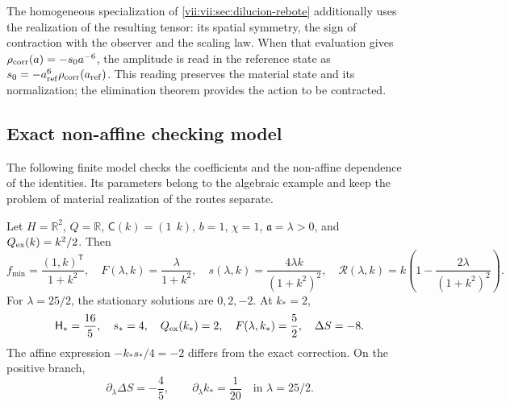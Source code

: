 The homogeneous specialization of
\ref{vii:vii:sec:dilucion-rebote} additionally uses the realization of the
resulting tensor: its spatial symmetry, the sign of contraction
with the observer and the scaling law. When that evaluation gives
\(\rho_{\rm corr}(a)=-s_0a^{-6}\), the amplitude is read in the
reference state as
\(s_0=-a_{\rm ref}^{6}\rho_{\rm corr}(a_{\rm ref})\).
This reading preserves the material state and its normalization; the
elimination theorem provides the action to be contracted.

\subsection{Exact non-affine checking model}
\label{vii:vii:subsec:control-no-afin}

The following finite model checks the coefficients and the
non-affine dependence of the identities. Its parameters belong
to the algebraic example and keep the problem of material
realization of the routes separate.

\begin{proposition}
\label{vii:vii:prop:ejemplo-no-afin}
Let \(H=\mathbb R^2\), \(Q=\mathbb R\),
\(\mathsf C(k)=(1\ \ k)\), \(b=1\), \(\chi=1\),
\(\mathfrak a=\lambda>0\), and \(Q_{\rm ex}(k)=k^2/2\).
Then
\begin{equation}
 f_{\min}=\frac{(1,k)^{\mathsf T}}{1+k^2},\quad
 F(\lambda,k)=\frac{\lambda}{1+k^2},\quad
 s(\lambda,k)=\frac{4\lambda k}{(1+k^2)^2},\quad
 \mathcal R(\lambda,k)
    =k\left(1-\frac{2\lambda}{(1+k^2)^2}\right).
 \label{vii:vii:eq:ejemplo-minimo-no-afin}
\end{equation}
For \(\lambda=25/2\), the stationary solutions are
\(0,2,-2\). At \(k_*=2\),
\begin{equation}
 \mathsf H_*=\frac{16}{5},\quad s_*=4,\quad
 Q_{\rm ex}(k_*)=2,\quad F(\lambda,k_*)=\frac52,
 \quad \Delta S=-8.
 \label{vii:vii:eq:valores-ejemplo-no-afin}
\end{equation}
The affine expression \(-k_*s_*/4=-2\) differs from the exact
correction. On the positive branch,
\begin{equation}
 \partial_\lambda\Delta S=-\frac45,
 \qquad \partial_\lambda k_* =\frac1{20}
 \quad\text{in }\lambda=25/2.
 \label{vii:vii:eq:derivadas-ejemplo-no-afin}
\end{equation}
\end{proposition}

